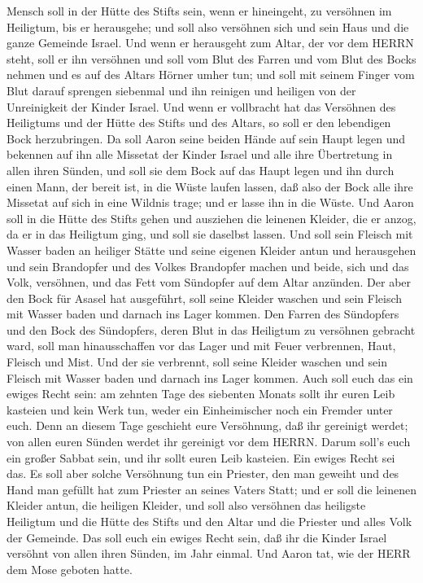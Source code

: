 Mensch soll in der Hütte des Stifts sein, wenn er hineingeht, zu
versöhnen im Heiligtum, bis er herausgehe; und soll also versöhnen sich
und sein Haus und die ganze Gemeinde Israel.  Und wenn er
herausgeht zum Altar, der vor dem HERRN steht, soll er ihn versöhnen und
soll vom Blut des Farren und vom Blut des Bocks nehmen und es auf des
Altars Hörner umher tun;  und soll mit seinem Finger vom
Blut darauf sprengen siebenmal und ihn reinigen und heiligen von der
Unreinigkeit der Kinder Israel.  Und wenn er vollbracht hat
das Versöhnen des Heiligtums und der Hütte des Stifts und des Altars, so
soll er den lebendigen Bock herzubringen.  Da soll Aaron
seine beiden Hände auf sein Haupt legen und bekennen auf ihn alle
Missetat der Kinder Israel und alle ihre Übertretung in allen ihren
Sünden, und soll sie dem Bock auf das Haupt legen und ihn durch einen
Mann, der bereit ist, in die Wüste laufen lassen,  daß also
der Bock alle ihre Missetat auf sich in eine Wildnis trage; und er lasse
ihn in die Wüste.  Und Aaron soll in die Hütte des Stifts
gehen und ausziehen die leinenen Kleider, die er anzog, da er in das
Heiligtum ging, und soll sie daselbst lassen.  Und soll
sein Fleisch mit Wasser baden an heiliger Stätte und seine eigenen
Kleider antun und herausgehen und sein Brandopfer und des Volkes
Brandopfer machen und beide, sich und das Volk, versöhnen, 
und das Fett vom Sündopfer auf dem Altar anzünden.  Der
aber den Bock für Asasel hat ausgeführt, soll seine Kleider waschen und
sein Fleisch mit Wasser baden und darnach ins Lager kommen.
 Den Farren des Sündopfers und den Bock des Sündopfers,
deren Blut in das Heiligtum zu versöhnen gebracht ward, soll man
hinausschaffen vor das Lager und mit Feuer verbrennen, Haut, Fleisch und
Mist.  Und der sie verbrennt, soll seine Kleider waschen
und sein Fleisch mit Wasser baden und darnach ins Lager kommen.
 Auch soll euch das ein ewiges Recht sein: am zehnten Tage
des siebenten Monats sollt ihr euren Leib kasteien und kein Werk tun,
weder ein Einheimischer noch ein Fremder unter euch.  Denn
an diesem Tage geschieht eure Versöhnung, daß ihr gereinigt werdet; von
allen euren Sünden werdet ihr gereinigt vor dem HERRN. 
Darum soll's euch ein großer Sabbat sein, und ihr sollt euren Leib
kasteien. Ein ewiges Recht sei das.  Es soll aber solche
Versöhnung tun ein Priester, den man geweiht und des Hand man gefüllt
hat zum Priester an seines Vaters Statt; und er soll die leinenen
Kleider antun, die heiligen Kleider,  und soll also
versöhnen das heiligste Heiligtum und die Hütte des Stifts und den Altar
und die Priester und alles Volk der Gemeinde.  Das soll
euch ein ewiges Recht sein, daß ihr die Kinder Israel versöhnt von allen
ihren Sünden, im Jahr einmal. Und Aaron tat, wie der HERR dem Mose
geboten hatte.

